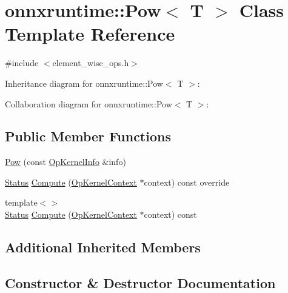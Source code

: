\hypertarget{classonnxruntime_1_1Pow}{}\section{onnxruntime\+:\+:Pow$<$ T $>$ Class Template Reference}
\label{classonnxruntime_1_1Pow}


{\ttfamily \#include $<$element\+\_\+wise\+\_\+ops.\+h$>$}



Inheritance diagram for onnxruntime\+:\+:Pow$<$ T $>$\+:


Collaboration diagram for onnxruntime\+:\+:Pow$<$ T $>$\+:
\subsection*{Public Member Functions}
\begin{DoxyCompactItemize}
\item 
\mbox{\hyperlink{classonnxruntime_1_1Pow_a82d8880182a952fa82c21926a3c71db0}{Pow}} (const \mbox{\hyperlink{classonnxruntime_1_1OpKernelInfo}{Op\+Kernel\+Info}} \&info)
\item 
\mbox{\hyperlink{classonnxruntime_1_1common_1_1Status}{Status}} \mbox{\hyperlink{classonnxruntime_1_1Pow_a6776c40d0db3a94faec0aac3c175ae22}{Compute}} (\mbox{\hyperlink{classonnxruntime_1_1OpKernelContext}{Op\+Kernel\+Context}} $\ast$context) const override
\item 
{\footnotesize template$<$$>$ }\\\mbox{\hyperlink{classonnxruntime_1_1common_1_1Status}{Status}} \mbox{\hyperlink{classonnxruntime_1_1Pow_a84a36bbbc486008585a31365dc2936b9}{Compute}} (\mbox{\hyperlink{classonnxruntime_1_1OpKernelContext}{Op\+Kernel\+Context}} $\ast$context) const
\end{DoxyCompactItemize}
\subsection*{Additional Inherited Members}


\subsection{Constructor \& Destructor Documentation}
\mbox{\label{classonnxruntime_1_1Pow_a82d8880182a952fa82c21926a3c71db0}} 
